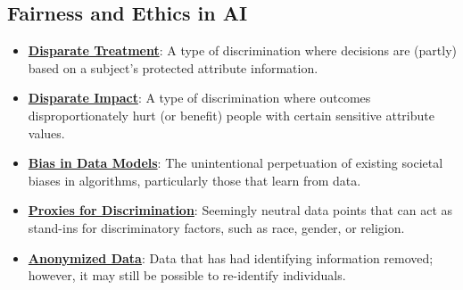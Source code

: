 \documentclass{article}%
\begin{document}
%
\subsection{Fairness and Ethics in AI}%
\label{subsec:FairnessandEthicsinAI}%
\begin{itemize}[leftmargin=*]%
\item \href{https://purdue.brightspace.com/d2l/common/assets/pdfjs-d2l-dist/1.0.14-legacy/web/viewer.html?file=%2Fcontent%2Fenforced%2F1095467-wl.202510.CS.24300.001%2F16L2-ethics.pdf%3Fou%3D1095467&lang=en-us&container=d2l-fileviewer-rendered-pdf&fullscreen=d2l-fileviewer-rendered-pdf-dialog&height=667#page=19}{\textbf{Disparate Treatment}}: A type of discrimination where decisions are (partly) based on a subject's protected attribute information.%
\item \href{https://purdue.brightspace.com/d2l/common/assets/pdfjs-d2l-dist/1.0.14-legacy/web/viewer.html?file=%2Fcontent%2Fenforced%2F1095467-wl.202510.CS.24300.001%2F16L2-ethics.pdf%3Fou%3D1095467&lang=en-us&container=d2l-fileviewer-rendered-pdf&fullscreen=d2l-fileviewer-rendered-pdf-dialog&height=667#page=19}{\textbf{Disparate Impact}}: A type of discrimination where outcomes disproportionately hurt (or benefit) people with certain sensitive attribute values.%
\item \href{https://purdue.brightspace.com/d2l/common/assets/pdfjs-d2l-dist/1.0.14-legacy/web/viewer.html?file=%2Fcontent%2Fenforced%2F1095467-wl.202510.CS.24300.001%2F16L2-ethics.pdf%3Fou%3D1095467&lang=en-us&container=d2l-fileviewer-rendered-pdf&fullscreen=d2l-fileviewer-rendered-pdf-dialog&height=667#page=12}{\textbf{Bias in Data Models}}: The unintentional perpetuation of existing societal biases in algorithms, particularly those that learn from data.%
\item \href{https://purdue.brightspace.com/d2l/common/assets/pdfjs-d2l-dist/1.0.14-legacy/web/viewer.html?file=%2Fcontent%2Fenforced%2F1095467-wl.202510.CS.24300.001%2F16L2-ethics.pdf%3Fou%3D1095467&lang=en-us&container=d2l-fileviewer-rendered-pdf&fullscreen=d2l-fileviewer-rendered-pdf-dialog&height=667#page=13}{\textbf{Proxies for Discrimination}}: Seemingly neutral data points that can act as stand-ins for discriminatory factors, such as race, gender, or religion.%
\item \href{https://purdue.brightspace.com/d2l/common/assets/pdfjs-d2l-dist/1.0.14-legacy/web/viewer.html?file=%2Fcontent%2Fenforced%2F1095467-wl.202510.CS.24300.001%2F16L2-ethics.pdf%3Fou%3D1095467&lang=en-us&container=d2l-fileviewer-rendered-pdf&fullscreen=d2l-fileviewer-rendered-pdf-dialog&height=667#page=10}{\textbf{Anonymized Data}}: Data that has had identifying information removed; however, it may still be possible to re-identify individuals.%

\end{itemize}
\end{document}
